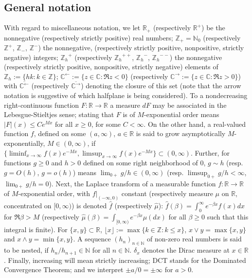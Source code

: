 \documentclass[pdftex,oneside,11pt,reqno]{amsart}
\theoremstyle{definition}
\theoremstyle{theorem}
\theoremstyle{remark}
\numberwithin{equation}{section}
\numberwithin{definition}{section}
\begin{document}
\subsection{General notation}\label{subsection:further_general_notation}
With regard to miscellaneous notation, we let $\mathbb{R}_+$ (respectively $\mathbb{R}^+$) be the nonnegative (respectively strictly positive) real numbers;  $\mathbb{Z}_+=\mathbb{N}_0$ (respectively $\mathbb{Z}^+$, $\mathbb{Z}_-$, $\mathbb{Z}^-$) the nonnegative, (respectively strictly positive, nonpositive, strictly negative) integers; ${\mathbb{Z}_h}^+$ (respectively ${\mathbb{Z}_h}^{++}$, ${\mathbb{Z}_h}^-$, ${\mathbb{Z}_h}^{--}$) the nonnegative (respectively strictly positive, nonpositive, strictly negative) elements of ${\mathbb{Z}_h}:=\{hk:k\in{\mathbb Z}\}$; $\mathbb{C}^{\leftarrow}:=\{z\in\mathbb{C}\!\!:\Re z<0\}$ (respectively $\mathbb{C}^{\rightarrow}:=\{z\in\mathbb{C}\!\!:\Re z>0\}$) with $\overline{\mathbb{C}^{\leftarrow}}$ (respectively $\overline{\mathbb{C}^{\rightarrow}}$) denoting the closure of this set (note that the arrow notation is suggestive of which halfplane is being considered). To a nondecreasing right-continuous function $F:\mathbb{R}\to\mathbb{R}$ a measure $dF$ may be associated in the Lebesgue-Stieltjes sense; stating that $F$ is of $M$-exponential order means $\vert F\vert(x)\leq C e^{M x}$ for all $x\geq 0$, for some $C<\infty$. On the other hand, a real-valued function $f$, defined on some $(a,\infty)$, $a\in \mathbb{R}$ is said to grow asymptotically $M$-exponentially, $M\in (0,\infty)$, if $\{\liminf_{x\to \infty}f(x)e^{-Mx},\limsup_{x\to\infty} f(x)e^{-Mx}\}\subset (0,\infty)$. Further, for functions $g\geq 0$ and $h>0$ defined on some right neighborhood of $0$, $g\sim h$ (resp. $g=O(h)$, $g=o(h)$) means $\lim_{0+}g/h\in (0,\infty)$ (resp. $\limsup_{0+}g/h<\infty$, $\lim_{0+}g/h=0$). Next, the Laplace transform of a measurable function $f:\mathbb{R}\to\mathbb{R}$ of $M$-exponential order, with $f\vert_{(-\infty,0)}$ constant (respectively measure $\mu$ on $\mathbb{R}$, concentrated on $[0,\infty)$) is denoted $\hat{f}$ (respectively $\hat{\mu}$): $\hat{f}(\beta)=\int_0^\infty e^{-\beta x}f(x)dx$ for $\Re\beta>M$ (respectively $\hat{\mu}(\beta)=\int_{[0,\infty)}e^{-\beta x}\mu(dx)$ for all $\beta\geq 0$ such that this integral is finite). For $\{x,y\}\subset\mathbb{R}$, $\lfloor x\rfloor:=\max\{k\in {\mathbb Z}:k\leq x\}$, $x\lor y=\max\{x,y\}$ and $x\land y=\min\{x,y\}$. A sequence $(h_n)_{n\in\mathbb{N}}$ of non-zero real numbers is said to be nested, if $h_n/h_{n+1}\in \mathbb{N}$ for all $n\in \mathbb{N}$. $\delta_x$ denotes the Dirac measure at $x\in \mathbb{R}$. Finally, increasing will mean strictly increasing; DCT stands for the Dominated Convergence Theorem; and we interpret $\pm a/0=\pm \infty$ for $a>0$. 
\end{document}
